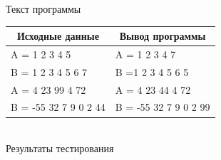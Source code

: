 \documentclass[a4paper,14pt]{extarticle}
\begin{document}

\begin{center}
Текст программы\\
\vspace{0.6cm}
\begin{tabular}{|l|l|}
\hline
\multicolumn{1}{|c|}{Исходные данные}& \multicolumn{1}{|c|}{Вывод программы}\\
\hline
A = 1 2 3 4 5 & A = 1 2 3 4 7 \\
B = 1 2 3 4 5 6 7 & B =1 2 3 4 5 6 5 \\
\hline
A = 4 23 99 4 72 & A = 4 23 44 4 72 \\
B = -55 32 7 9 0 2 44 & B = -55 32 7 9 0 2 99 \\
\hline
\end{tabular}\\
\vspace{0.3cm}
Результаты тестирования
\end{center}
\end{document}
